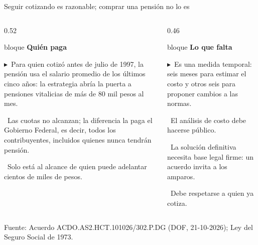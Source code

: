 \documentclass[aspectratio=169,12pt]{beamer}
\newcommand{\frente}[2]{%
    \begin{beamercolorbox}[wd=\linewidth,sep=5pt,rounded=false]{bloque}
      {\color{petroleo}\bfseries #1}\par\vspace{0.2em}\small #2
    \end{beamercolorbox}}
\newcommand{\punto}{{\color{petroleo}$\blacktriangleright$}\ }
\newcommand{\fuente}[1]{\par\vfill{\color{grisclaro}\scriptsize #1}}
\begin{document}
\begin{frame}{Seguir cotizando es razonable; comprar una pensión no lo es}
  \begin{columns}[T,onlytextwidth]
    \begin{column}{0.52\textwidth}
      \frente{Quién paga}{\footnotesize\punto Para quien cotizó antes de julio de 1997, la pensión usa el salario promedio de los últimos cinco años: la estrategia abría la puerta a pensiones vitalicias de más de 80 mil pesos al mes.\par\vspace{0.2em}\punto Las cuotas no alcanzan; la diferencia la paga el Gobierno Federal, es decir, todos los contribuyentes, incluidos quienes nunca tendrán pensión.\par\vspace{0.2em}\punto Solo está al alcance de quien puede adelantar cientos de miles de pesos.}
    \end{column}
    \begin{column}{0.46\textwidth}
      \frente{Lo que falta}{\footnotesize\punto Es una medida temporal: seis meses para estimar el costo y otros seis para proponer cambios a las normas.\par\vspace{0.2em}\punto El análisis de costo debe hacerse público.\par\vspace{0.2em}\punto La solución definitiva necesita base legal firme: un acuerdo invita a los amparos.\par\vspace{0.2em}\punto Debe respetarse a quien ya cotiza.}
    \end{column}
  \end{columns}
  \fuente{\raggedright Fuente: Acuerdo ACDO.AS2.HCT.101026/302.P.DG (DOF, 21-10-2026); Ley del Seguro Social de 1973.\par}
\end{frame}
\end{document}
